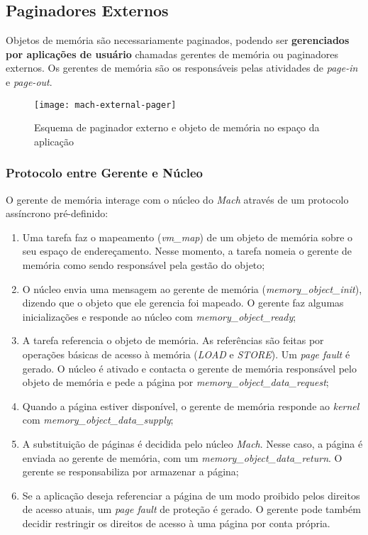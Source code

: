 \subsection{Paginadores Externos}
Objetos de memória são necessariamente paginados, podendo ser \textbf{gerenciados por aplicações de usuário} chamadas gerentes de memória ou paginadores externos. Os gerentes de memória são os responsáveis pelas atividades de \textit{page-in} e \textit{page-out}.

\begin{figure}[H]
  \centering
  \texttt{[image: mach-external-pager]}
  \caption{Esquema de paginador externo e objeto de memória no espaço da aplicação}
  \label{fig:mach-external-pager}
\end{figure}

\subsubsection{Protocolo entre Gerente e Núcleo}
O gerente de memória interage com o núcleo do \textit{Mach} através de um protocolo assíncrono pré-definido:

\begin{enumerate}
  \item Uma tarefa faz o mapeamento (\textit{vm\_map}) de um objeto de memória sobre o seu espaço de endereçamento. Nesse momento, a tarefa nomeia o gerente de memória como sendo responsável pela gestão do objeto;

  \item O núcleo envia uma mensagem ao gerente de memória (\textit{memory\_object\_init}), dizendo que o objeto que ele gerencia foi mapeado. O gerente faz algumas inicializações e responde ao núcleo com \textit{memory\_object\_ready};

  \item A tarefa referencia o objeto de memória. As referências são feitas por operações básicas de acesso à memória (\textit{LOAD} e \textit{STORE}). Um \textit{page fault} é gerado. O núcleo é ativado e contacta o gerente de memória responsável pelo objeto de memória e pede a página por \textit{memory\_object\_data\_request};

  \item Quando a página estiver disponível, o gerente de memória responde ao \textit{kernel} com \textit{memory\_object\_data\_supply};

  \item A substituição de páginas é decidida pelo núcleo \textit{Mach}. Nesse caso, a página é enviada ao gerente de memória, com um \textit{memory\_object\_data\_return}. O gerente se responsabiliza por armazenar a página;

  \item Se a aplicação deseja referenciar a página de um modo proibido pelos direitos de acesso atuais, um \textit{page fault} de proteção é gerado. O gerente pode também decidir restringir os direitos de acesso à uma página por conta própria.
\end{enumerate}


